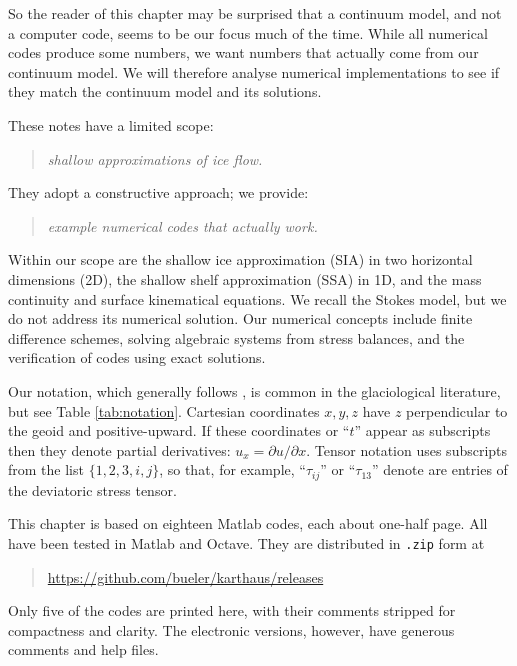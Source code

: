 \documentclass[letterpaper,final,12pt,reqno]{amsart}
\begin{document}
So the reader of this chapter may be surprised that a continuum model, and not a computer code, seems to be our focus much of the time.  While all numerical codes produce some numbers, we want numbers that actually come from our continuum model.  We will therefore analyse numerical implementations to see if they match the continuum model and its solutions.

These notes have a limited scope:
  \begin{quote}\emph{shallow approximations of ice flow.}\end{quote}
They adopt a constructive approach; we provide:
  \begin{quote}\emph{example numerical codes that actually work.}\end{quote}
Within our scope are the shallow ice approximation (SIA) in two horizontal dimensions (2D), the shallow shelf approximation (SSA) in 1D, and the mass continuity and surface kinematical equations.  We recall the Stokes model, but we do not address its numerical solution.  Our numerical concepts include finite difference schemes, solving algebraic systems from stress balances, and the verification of codes using exact solutions.

Our notation, which generally follows \cite{GreveBlatter2009}, is common in the glaciological literature, but see Table \ref{tab:notation}.  Cartesian coordinates $x,y,z$ have $z$ perpendicular to the geoid and positive-upward.  If these coordinates or ``$t$'' appear as subscripts then they denote partial derivatives: $u_x = \partial u/\partial x$.  Tensor notation uses subscripts from the list $\{1,2,3,i,j\}$, so that, for example, ``$\tau_{ij}$'' or ``$\tau_{13}$'' denote are entries of the deviatoric stress tensor.

This chapter is based on eighteen Matlab codes, each about one-half page.  All have been tested in Matlab and Octave.  They are distributed in \texttt{.zip} form at
\begin{quote}
\url{https://github.com/bueler/karthaus/releases}
\end{quote}
\noindent Only five of the codes are printed here, with their comments stripped for compactness and clarity.  The electronic versions, however, have generous comments and help files.
\end{document}
